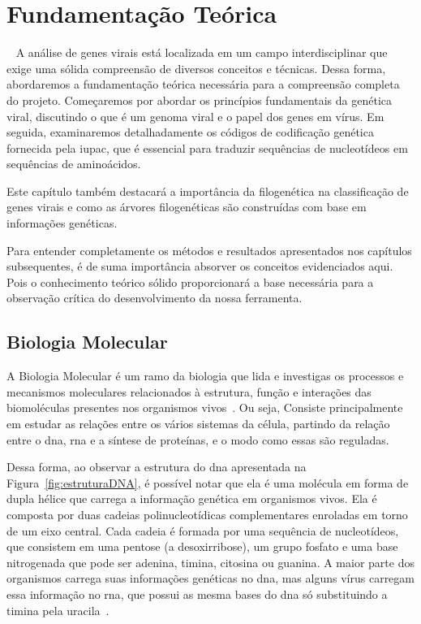 
\setlength{\parskip}{0.3cm}

\chapter{Fundamentação Teórica}~\label{ch:fundamentacao}
A análise de genes virais está localizada em um campo interdisciplinar que exige uma sólida compreensão de diversos conceitos e técnicas. Dessa forma, abordaremos a fundamentação teórica necessária para a compreensão completa do projeto. Começaremos por abordar os princípios fundamentais da genética viral, discutindo o que é um genoma viral e o papel dos genes em vírus. Em seguida, examinaremos detalhadamente os códigos de codificação genética fornecida pela \gls{iupac}, que é essencial para traduzir sequências de nucleotídeos em sequências de aminoácidos.

Este capítulo também destacará a importância da filogenética na classificação de genes virais e como as árvores filogenéticas são construídas com base em informações genéticas.

Para entender completamente os métodos e resultados apresentados nos capítulos subsequentes, é de suma importância absorver os conceitos evidenciados aqui. Pois o conhecimento teórico sólido proporcionará a base necessária para a observação crítica do desenvolvimento da nossa ferramenta.

\section{Biologia Molecular}
A Biologia Molecular é um ramo da biologia que lida e investigas os processos e mecanismos moleculares relacionados à estrutura, função e interações das biomoléculas presentes nos organismos vivos~\cite{alberts_biologia_2017}. Ou seja, Consiste principalmente em estudar as relações entre os vários sistemas da célula, partindo da relação entre o \gls{dna}, \gls{rna} e a síntese de proteínas, e o modo como essas são reguladas.

Dessa forma, ao observar a estrutura do \gls{dna} apresentada na Figura~\ref{fig:estruturaDNA}, é possível notar que ela é uma molécula em forma de dupla hélice que carrega a informação genética em organismos vivos. Ela é composta por duas cadeias polinucleotídicas complementares enroladas em torno de um eixo central. Cada cadeia é formada por uma sequência de nucleotídeos, que consistem em uma pentose (a desoxirribose), um grupo fosfato e uma base nitrogenada que pode ser \gls{adenina}, \gls{timina}, \gls{citosina} ou \gls{guanina}. A maior parte dos organismos carrega suas informações genéticas no \gls{dna}, mas alguns vírus carregam essa informação no \gls{rna}, que possui as mesma bases do \gls{dna} só substituindo a \gls{timina} pela \gls{uracila}~\cite{genetica_peter_2017}.


